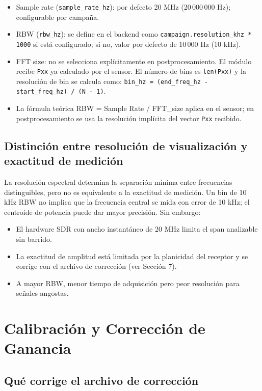\begin{itemize}
\item Sample rate (\texttt{sample\_rate\_hz}): por defecto 20 MHz (20\,000\,000 Hz); configurable por campaña.
\item RBW (\texttt{rbw\_hz}): se define en el backend como \texttt{campaign.resolution\_khz * 1000} si está configurado; si no, valor por defecto de 10\,000 Hz (10 kHz).
\item FFT size: no se selecciona explícitamente en postprocesamiento. El módulo recibe \texttt{Pxx} ya calculado por el sensor. El número de bins es \texttt{len(Pxx)} y la resolución de bin se calcula como: \texttt{bin\_hz = (end\_freq\_hz - start\_freq\_hz) / (N - 1)}.
\item La fórmula teórica RBW = Sample Rate / FFT\_size aplica en el sensor; en postprocesamiento se usa la resolución implícita del vector \texttt{Pxx} recibido.
\end{itemize}

\subsection{Distinción entre resolución de visualización y exactitud de medición}

La resolución espectral determina la separación mínima entre frecuencias distinguibles, pero no es equivalente a la exactitud de medición. Un bin de 10 kHz RBW no implica que la frecuencia central se mida con error de 10 kHz; el centroide de potencia puede dar mayor precisión. Sin embargo:

\begin{itemize}
\item El hardware SDR con ancho instantáneo de 20 MHz limita el span analizable sin barrido.
\item La exactitud de amplitud está limitada por la planicidad del receptor y se corrige con el archivo de corrección (ver Sección 7).
\item A mayor RBW, menor tiempo de adquisición pero peor resolución para señales angostas.
\end{itemize}

\section{Calibración y Corrección de Ganancia}

\subsection{Qué corrige el archivo de corrección}

